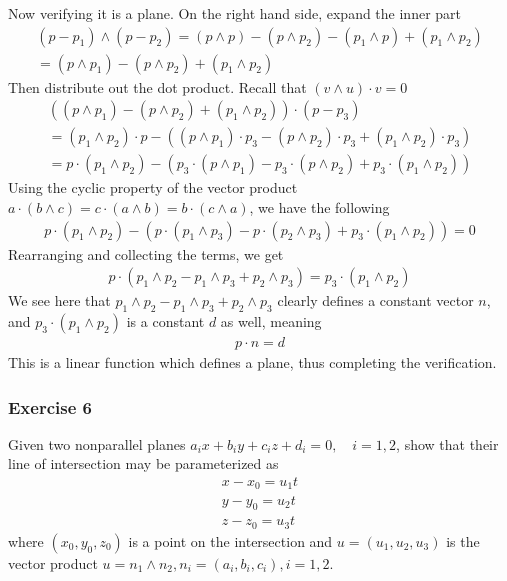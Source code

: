 \documentclass{article}
\begin{document}
	Now verifying it is a plane. On the right hand side, expand the inner part
	\begin{gather*}
		(p - p_1) \wedge (p - p_2) = (p \wedge p) - (p \wedge p_2) - (p_1 \wedge p) + (p_1 \wedge p_2) \\
		= (p \wedge p_1) - (p \wedge p_2) + (p_1 \wedge p_2)
	\end{gather*}
	Then distribute out the dot product. Recall that $(v \wedge u) \cdot v = 0$
	\begin{gather*}
		\left( (p \wedge p_1) - (p \wedge p_2) + (p_1 \wedge p_2) \right) \cdot (p - p_3) \\
		= (p_1 \wedge p_2) \cdot p - \left( (p \wedge p_1) \cdot p_3 - (p \wedge p_2) \cdot p_3 + (p_1 \wedge p_2) \cdot p_3 \right) \\
		= p \cdot (p_1 \wedge p_2) - \left( p_3 \cdot (p \wedge p_1) - p_3 \cdot (p \wedge p_2) + p_3 \cdot (p_1 \wedge p_2) \right)
	\end{gather*}	
	Using the cyclic property of the vector product $a \cdot (b \wedge c) = c \cdot (a \wedge b) = b \cdot (c \wedge a)$, we have the following
	\begin{gather*}
		p \cdot (p_1 \wedge p_2) - \left( p \cdot (p_1 \wedge p_3) - p \cdot (p_2 \wedge p_3) + p_3 \cdot (p_1 \wedge p_2) \right) = 0
	\end{gather*}
	Rearranging and collecting the terms, we get
	\begin{gather*}
		p \cdot (p_1 \wedge p_2 - p_1 \wedge p_3 + p_2 \wedge p_3) = p_3 \cdot (p_1 \wedge p_2)
	\end{gather*}
	We see here that $p_1 \wedge p_2 - p_1 \wedge p_3 + p_2 \wedge p_3$ clearly defines a constant vector $n$, and $p_3 \cdot (p_1 \wedge p_2)$ is a constant $d$ as well, meaning
	\begin{gather*}
		p \cdot n = d
	\end{gather*}
	This is a linear function which defines a plane, thus completing the verification.
	
	\subsubsection*{Exercise 6}
	Given two nonparallel planes $a_ix + b_iy + c_iz + d_i = 0, \quad i = 1, 2$, show that their line of intersection may be parameterized as
	\begin{gather*}
		x - x_0 = u_1t \\
		y - y_0 = u_2t \\
		z - z_0 = u_3t
	\end{gather*}
	where $(x_0, y_0, z_0)$ is a point on the intersection and $u = (u_1, u_2, u_3)$ is the vector product $u = n_1 \wedge n_2, n_i = (a_i, b_i, c_i), i = 1, 2$.
	
\end{document}
